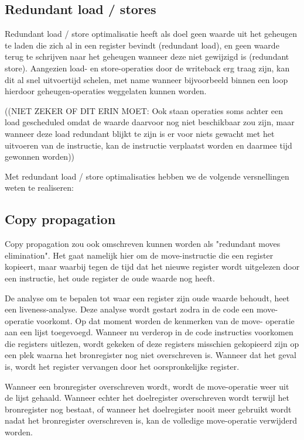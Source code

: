 \documentclass[a4paper,10pt]{article}
\begin{document}
\subsection{Redundant load / stores}
Redundant load / store optimalisatie heeft als doel geen waarde uit het
geheugen te laden die zich al in een register bevindt (redundant load), en geen
waarde terug te schrijven naar het geheugen wanneer deze niet gewijzigd is
(redundant store). Aangezien load- en store-operaties door de writeback erg
traag zijn, kan dit al snel uitvoertijd schelen, met name wanneer bijvoorbeeld
binnen een loop hierdoor geheugen-operaties weggelaten kunnen worden.

((NIET ZEKER OF DIT ERIN MOET: Ook staan operaties soms achter een load
gescheduled omdat de waarde daarvoor nog niet beschikbaar zou zijn, maar
wanneer deze load redundant blijkt te zijn is er voor niets gewacht met het
uitvoeren van de instructie, kan de instructie verplaatst worden en daarmee
tijd gewonnen worden))

Met redundant load / store optimalisaties hebben we de volgende versnellingen
weten te realiseren:

\subsection{Copy propagation}
Copy propagation zou ook omschreven kunnen worden als "redundant moves
elimination". Het gaat namelijk hier om de move-instructie die een register 
kopieert, maar waarbij tegen de tijd dat het nieuwe register wordt 
uitgelezen door een instructie, het oude register de oude waarde nog heeft.

De analyse om te bepalen tot waar een register zijn oude waarde behoudt, 
heet een liveness-analyse. Deze analyse wordt gestart zodra in de code een
move-operatie voorkomt. Op dat moment worden de kenmerken van de move-
operatie aan een lijst toegevoegd. Wanneer nu verderop in de code 
instructies voorkomen die registers uitlezen, wordt gekeken of deze 
registers misschien gekopieerd zijn op een plek waarna het bronregister nog 
niet overschreven is. Wanneer dat het geval is, wordt het register vervangen
door het oorspronkelijke register.

Wanneer een bronregister overschreven wordt, wordt de move-operatie weer uit de
lijst gehaald. Wanneer echter het doelregister overschreven wordt terwijl het
bronregister nog bestaat, of wanneer het doelregister nooit meer gebruikt wordt
nadat het bronregister overschreven is, kan de volledige move-operatie
verwijderd worden.
\end{document}
